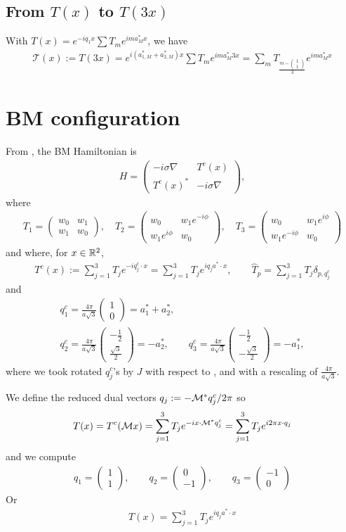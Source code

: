 \documentclass[11pt,a4paper,reqno,french,tikz]{amsart}
\newcommand{\pa}[1]{\left( #1 \right)} %
\newcommand{\na}{\nabla} %
\newcommand{\f}[2]{\frac{#1}{#2}} %
\newcommand{\mat}[1]{\begin{pmatrix} #1 \end{pmatrix}} %
\def\1{{\mathds{1}}}
\def\1{{\mathds{1}}}
\begin{document}
\subsection{From $T(x)$ to $T(3x)$}%
\label{sub:from_t_x_to_t_3x_}

With $T(x) = e^{-iq_1 x} \sum T_m e^{i m a_M^* x}$, we have
\begin{align*}
\mathcal{T}(x) := T(3x) = e^{i\pa{a_{1,M}^* + a_{2,M}^*}x}  \sum T_m e^{i m a_M^* 3x} = \sum_m T_{\f{m-\mat{1\\1}}{3}} e^{ima_M^* x}
\end{align*}


\section{BM configuration}%
\label{sec:bm_configuration}


From \cite{BecEmbWitZwo21}, the BM Hamiltonian is
\begin{align*}
	H = \mat{-i\sigma \na & T^c(x) \\ T^c(x)^* & -i \sigma \na},
\end{align*}
where
\begin{align*}
\boxed{T_1 = \mat{w_0 & w_1 \\ w_1 & w_0}, \quad  T_2 = \mat{w_0 &  w_1e^{-i\phi} \\  w_1e^{i\phi} & w_0}, \quad T_3 = \mat{w_0 &  w_1e^{i\phi} \\  w_1e^{-i\phi} & w_0}}
\end{align*}
and where, for $x \in \mathbb{R}^2$,
\begin{align*}
T^c(x) := \sum_{j=1}^3 T_j e^{-iq^c_j \cdot x} = \sum_{j=1}^3 T_j e^{iq_j a^*\cdot x}, \qquad \widehat{T}_p = \sum_{j=1}^{3} T_j \delta_{p,q_j^c}
\end{align*}
and
\begin{multline*}
q^c_1 = \f{4\pi}{a\sqrt{3}} \mat{1 \\ 0} = a_1^* + a_2^*, \\
q^c_2 = \f{4\pi}{a\sqrt{3}} \mat{-\f 12 \\ \f{\sqrt{3}}{2}} = -a_2^*, \qquad q^c_3 = \f{4\pi}{a\sqrt{3}} \mat{-\f 12 \\ -\f{\sqrt{3}}{2}} = -a_1^*,
\end{multline*}
where we took rotated $q_j^c$'s by $J$ with respect to \cite{BecEmbWitZwo21}, and with a rescaling of $\f{4\pi}{a\sqrt{3}}$.

We define the reduced dual vectors $q_j := -\mathcal{M}^* q^c_j /2\pi$ so
\begin{align*}
T(x) = T^c(\mathcal{M} x) = \sum_{j=1}^3 T_j e^{-ix\cdot \mathcal{M}^* q_j^c}= \sum_{j=1}^3 T_j e^{i2\pi x\cdot q_j}
\end{align*}
and we compute
\begin{align*}
\boxed{q_1 = \mat{1 \\ 1}, \qquad q_{2} = \mat{0 \\ -1}, \qquad q_{3} = \mat{-1 \\ 0}}
\end{align*}
Or
\begin{align*}
\boxed{T(x) = \sum_{j=1}^3 T_j e^{i q_j a^* \cdot x}}
\end{align*}
\end{document}
